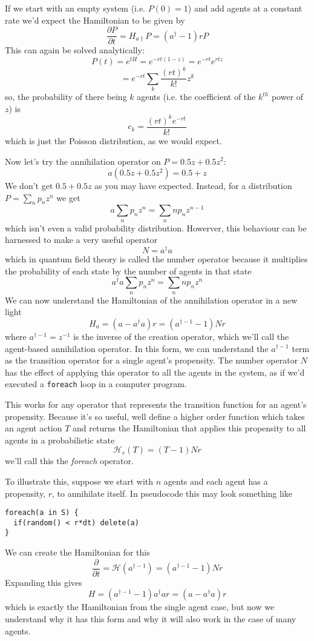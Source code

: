 \documentclass[letterpaper,twocolumn,10pt]{article}
\begin{document}
If we start with an empty system (i.e. $P(0) = 1$) and add agents at a constant rate we'd expect the Hamiltonian to be given by
\[
\frac{\partial P}{\partial t} = H_{a\dag}P = (a^\dag - 1)rP
\]
This can again be solved analytically:
\[
P(t) = e^{tH} = e^{-rt(1-z)} = e^{-rt}e^{rtz}
\]
\[
= e^{-rt}\sum_k \frac{(rt)^k}{k!}z^k
\]
so, the probability of there being $k$ agents (i.e. the coefficient of the $k^{th}$ power of $z$) is 
\[
c_k = \frac{(rt)^ke^{-rt}}{k!}
\]
which is just the Poisson distribution, as we would expect.

Now let's try the annihilation operator on $P = 0.5z + 0.5z^2$:
\[
a (0.5z + 0.5z^2) = 0.5 + z
\]
We don't get $0.5 + 0.5z$ as you may have expected. Instead, for a distribution $P = \sum_n p_nz^n$ we get
\[
a \sum_n p_nz^n = \sum_n n p_n z^{n-1}
\]
which isn't even a valid probability distribution. Howerver, this behaviour can be harnessed to make a very useful operator
\[
N = a^\dag a
\]
which in quantum field theory is called the number operator because it multiplies the probability of each state by the number of agents in that state
\[
a^\dag a \sum_n p_nz^n = \sum_n n p_n z^n
\]
We can now understand the Hamiltonian of the annihilation operator in a new light
\[
H_a = (a - a^\dag a)r = (a^{\dag -1} - 1)Nr
\]
where $a^{\dag -1} = z^{-1}$ is the inverse of the creation operator, which we'll call the agent-based annihilation operator. In this form, we can understand the $a^{\dag -1}$ term as the transition operator for a single agent's propensity. The number operator $N$ has the effect of applying this operator to all the agents in the system, as if we'd executed a \texttt{foreach} loop in a computer program.

This works for any operator that represents the transition function for an agent's propensity. Because it's so useful, well define a higher order function which takes an agent action $T$ and returns the Hamiltonian that applies this propensity to all agents in a probabilistic state
\[
\mathcal{H}_r(T) = (T - 1)Nr
\]
we'll call this the \textit{foreach} operator.

To illustrate this, suppose we start with $n$ agents and each agent has a propensity, $r$, to annihilate itself. In pseudocode this may look something like
\begin{verbatim}
foreach(a in S) {
  if(random() < r*dt) delete(a)
}
\end{verbatim}

We can create the Hamiltonian for this
\[
\frac{\partial}{\partial t} = \mathcal{H}(a^{\dag -1}) = (a^{\dag-1} - 1)Nr
\]
Expanding this gives
\[
H = (a^{\dag-1} - 1)a^\dag ar = (a - a^\dag a)r
\]
which is exactly the Hamiltonian from the single agent case, but now we understand why it has this form and why it will also work in the case of many agents.
\end{document}
